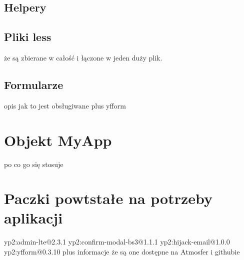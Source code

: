   \subsection{Helpery}
  \subsection{Pliki less}
    że są zbierane w całość i łączone w jeden duży plik.
  \subsection{Formularze}
    opis jak to jest obsługiwane plus yfform
  
\section{Objekt MyApp}
  po co go się stosuje

  
\section{Paczki powtstałe na potrzeby aplikacji}
yp2:admin-lte@2.3.1
yp2:confirm-modal-bs3@1.1.1
yp2:hijack-email@1.0.0
yp2:yfform@0.3.10
plus informacje że są one dostępne na Atmosfer i githubie